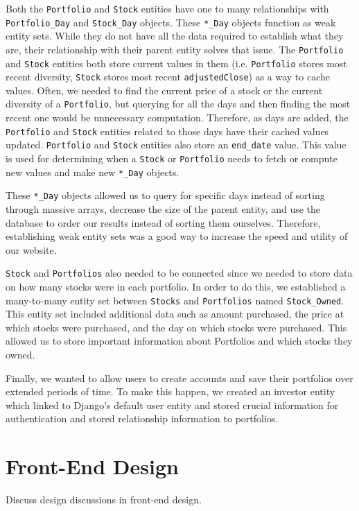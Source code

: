 \documentclass{article}
\begin{document}
Both the \texttt{Portfolio} and \texttt{Stock} entities have one to many relationships with \texttt{Portfolio\_Day} and \texttt{Stock\_Day} objects. These \texttt{*\_Day} objects function as weak entity sets. While they do not have all the data required to establish what they are, their relationship with their parent entity solves that issue. The \texttt{Portfolio} and \texttt{Stock} entities both store current values in them (i.e. \texttt{Portfolio} stores most recent diversity, \texttt{Stock} stores most recent \texttt{adjustedClose}) as a way to cache values. Often, we needed to find the current price of a stock or the current diversity of a \texttt{Portfolio}, but querying for all the days and then finding the most recent one would be unnecessary computation. Therefore, as days are added, the \texttt{Portfolio} and \texttt{Stock} entities related to those days have their cached values updated.  \texttt{Portfolio} and \texttt{Stock} entities also store an \texttt{end\_date} value.  This value is used for determining when a \texttt{Stock} or \texttt{Portfolio} needs to fetch or compute new values and make new \texttt{*\_Day} objects.  

These \texttt{*\_Day} objects allowed us to query for specific days instead of sorting through massive arrays, decrease the size of the parent entity, and use the database to order our results instead of sorting them ourselves.  Therefore, establishing weak entity sets was a good way to increase the speed and utility of our website.

\texttt{Stock} and \texttt{Portfolios} also needed to be connected since we needed to store data on how many stocks were in each portfolio.  In order to do this, we established a many-to-many entity set between \texttt{Stocks} and \texttt{Portfolios} named \texttt{Stock\_Owned}.  This entity set included additional data such as amount purchased, the price at which stocks were purchased, and the day on which stocks were purchased.  This allowed us to store important information about Portfolios and which stocks they owned.

Finally, we wanted to allow users to create accounts and save their portfolios over extended periods of time.  To make this happen, we created an investor entity which linked to Django’s default user entity and stored crucial information for authentication and stored relationship information to portfolios.


\section{Front-End Design} \label{sec:fe}
Discuss design discussions in front-end design.
\end{document}
